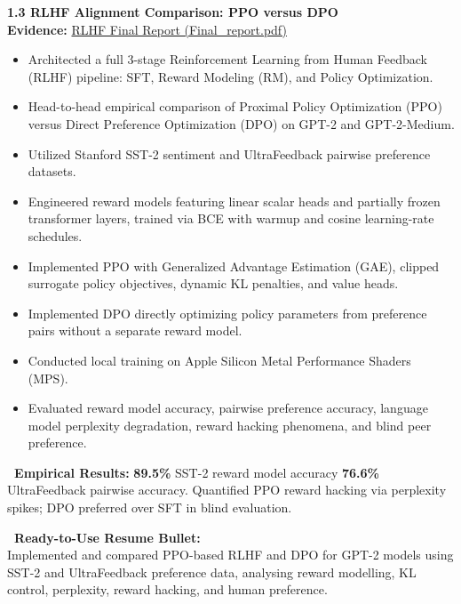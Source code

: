 \documentclass[10pt,a4paper]{article}
\newcommand{\statuscompleted}{\tcbox[on line, colback=completedbg, colframe=completed!50!white, size=small, arc=2pt, boxrule=0.5pt]{\scriptsize\bfseries\color{completed}\faIcon{check-circle}\ COMPLETED / SUBSTANTIAL}}
\begin{document}
\newpage

\begin{projectcard}
  \textbf{\large 1.3 RLHF Alignment Comparison: PPO versus DPO} \hfill \statuscompleted\\[2pt]
  {\footnotesize\color{textmuted}\textbf{Evidence:} \underline{RLHF Final Report (Final\_report.pdf)}}
  \begin{itemize}[leftmargin=14pt, itemsep=1.5pt, topsep=2pt]
    \item Architected a full 3-stage Reinforcement Learning from Human Feedback (RLHF) pipeline: SFT, Reward Modeling (RM), and Policy Optimization.
    \item Head-to-head empirical comparison of Proximal Policy Optimization (PPO) versus Direct Preference Optimization (DPO) on GPT-2 and GPT-2-Medium.
    \item Utilized Stanford SST-2 sentiment and UltraFeedback pairwise preference datasets.
    \item Engineered reward models featuring linear scalar heads and partially frozen transformer layers, trained via BCE with warmup and cosine learning-rate schedules.
    \item Implemented PPO with Generalized Advantage Estimation (GAE), clipped surrogate policy objectives, dynamic KL penalties, and value heads.
    \item Implemented DPO directly optimizing policy parameters from preference pairs without a separate reward model.
    \item Conducted local training on Apple Silicon Metal Performance Shaders (MPS).
    \item Evaluated reward model accuracy, pairwise preference accuracy, language model perplexity degradation, reward hacking phenomena, and blind peer preference.
  \end{itemize}
  \begin{metricsbox}
    \textbf{\ Empirical Results:} \textbf{89.5\%} SST-2 reward model accuracy \quad\textbar\quad \textbf{76.6\%} UltraFeedback pairwise accuracy. Quantified PPO reward hacking via perplexity spikes; DPO preferred over SFT in blind evaluation.
  \end{metricsbox}
  \begin{resumebox}
    \textbf{\color{accent}\ Ready-to-Use Resume Bullet:}\\
    Implemented and compared PPO-based RLHF and DPO for GPT-2 models using SST-2 and UltraFeedback preference data, analysing reward modelling, KL control, perplexity, reward hacking, and human preference.
  \end{resumebox}
\end{projectcard}
\end{document}
